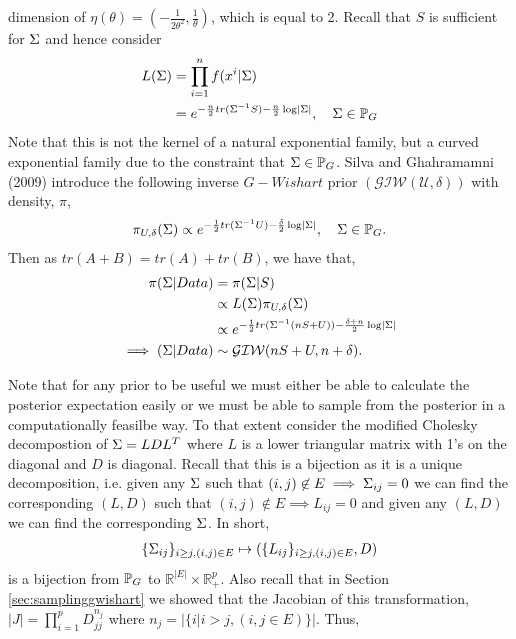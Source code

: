 \documentclass[12pt, leqno]{article}
\providecommand{\abs}[1]{\lvert#1\rvert}
\def\s{\ensuremath\Sigma}
\def\pg{\ensuremath\mathbb{P}_{{G}}}
\begin{document}
dimension of $\eta(\theta) = (-\frac{1}{2\theta^2},\frac{1}{\theta})$,
which is equal to 2.
Recall that $S$ is sufficient for $\s$ and hence consider
\begin{align*}
L(\s) &= \prod_{i=1}^n f(x^i|\s) \\ 
&= e^{-\frac{n}{2}tr(\s^{-1}S) -\frac{n}{2}\log \abs{\s}}, \quad \s
  \in \pg
\end{align*}
Note that this is not the kernel of a natural exponential family, but
a curved exponential family due to the constraint that $\s \in \pg$. 
Silva and Ghahramamni (2009) introduce the following inverse
$G-Wishart$ prior $(\mathcal{GIW(U,\delta)})$ with density, $\pi$,
\begin{align*}
\pi_{U, \delta} (\s) \propto e^{-\frac{1}{2}tr(\s^{-1}U) -
  \frac{\delta}{2} \log \abs{\s}}, \quad \s \in \pg.
\end{align*}
Then as $tr(A+B) = tr(A)+tr(B)$, we
have that,
\begin{align*}
\pi (\s|Data)  &= \pi (\s|S) \\
&\propto L(\s) \pi_{U, \delta} (\s)\\
&\propto e^{ - \frac{1}{2} tr( \s^{-1} (nS+U) ) -
  \frac{\delta+n}{2} \log \abs{\s} }\\
\implies ( \s | Data) &\sim \mathcal{GIW} (nS+U,n+\delta).
\end{align*}

Note that for any prior to be useful we must either be able to
calculate the posterior expectation easily or we must be able to
sample from the posterior in a computationally feasilbe way. To that
extent consider the modified Cholesky decompostion of $\s =
LDL^T$ where $L$ is a lower triangular matrix with 1's on the diagonal
and $D$ is diagonal. Recall that this is a bijection as it is a unique
decomposition, i.e. given any $\s$ such that $(i,j) \not\in E \implies
\s_{ij} = 0$ we can find the corresponding $(L,D)$ such that $(i,j) \not\in E \implies
L_{ij} = 0$ and given any $(L,D)$ we can find the corresponding
$\s$. 
In short, 
\begin{align*}
\{\s_{ij}\}_{i \geq j, (i,j) \in E} \mapsto (\{L_{ij}\}_{i \geq j,
  (i,j) \in E}, D)
\end{align*}
is a bijection from $\pg$ to $\mathbb{R}^{\abs{E}} \times
\mathbb{R}_+^{p}$. Also recall that in Section
\ref{sec:samplinggwishart} we showed that the Jacobian of this
transformation, $\abs{J} = \prod_{i=1}^p D_{jj}^{n_j}$ where $n_j =
\abs{\{i|i>j,(i,j \in E)\}}$. Thus,
\end{document}
